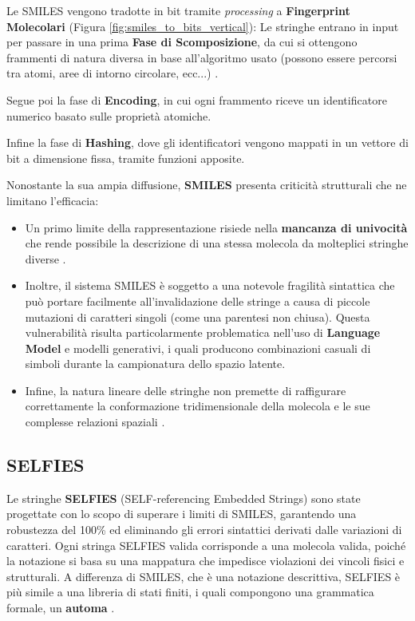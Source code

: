 Le SMILES vengono tradotte in bit tramite \textit{processing} a \textbf{Fingerprint Molecolari} (Figura \ref{fig:smiles_to_bits_vertical}):
Le stringhe entrano in input per passare in una prima \textbf{Fase di Scomposizione}, da cui si ottengono frammenti di natura diversa in base all'algoritmo usato (possono essere percorsi tra atomi, aree di intorno circolare, ecc...) \cite{boldiniEffectivenessMolecularFingerprints2024}.

Segue poi la fase di \textbf{Encoding}, in cui ogni frammento riceve un identificatore numerico basato sulle proprietà atomiche.

Infine la fase di \textbf{Hashing}, dove gli identificatori vengono mappati in un vettore di bit a dimensione fissa, tramite funzioni apposite.

Nonostante la sua ampia diffusione, \textbf{SMILES} presenta criticità strutturali che ne limitano l'efficacia:
\begin{itemize}
    \item Un primo limite della rappresentazione risiede nella \textbf{mancanza di univocità} che rende possibile la descrizione di una stessa molecola da molteplici stringhe diverse \cite{leonComparingSMILESSELFIES2024}.
    \item Inoltre, il sistema SMILES è soggetto a una notevole fragilità sintattica che può portare facilmente all'invalidazione delle stringe a causa di piccole mutazioni di caratteri singoli (come una parentesi non chiusa). 
    Questa vulnerabilità risulta particolarmente problematica nell'uso di \textbf{Language Model} e modelli generativi, i quali producono combinazioni casuali di simboli durante la campionatura dello spazio latente.
    \item Infine, la natura lineare delle stringhe non premette di raffigurare correttamente la conformazione tridimensionale della molecola e le sue complesse relazioni spaziali \cite{ucakReconstructionLosslessMolecular2023}.
\end{itemize}

\subsection{SELFIES}
Le stringhe \textbf{SELFIES} (SELF-referencing Embedded Strings) sono state progettate con lo scopo di superare i limiti di SMILES, garantendo una robustezza del 100\% \cite{krennSELFIESFutureMolecular2022} ed eliminando gli errori sintattici derivati dalle variazioni di caratteri.
Ogni stringa SELFIES valida corrisponde a una molecola valida, poiché la notazione si basa su una mappatura che impedisce violazioni dei vincoli fisici e strutturali. 
A differenza di SMILES, che è una notazione descrittiva, SELFIES è più simile a una libreria di stati finiti, i quali compongono una grammatica formale, un \textbf{automa} \cite{leonComparingSMILESSELFIES2024}.

